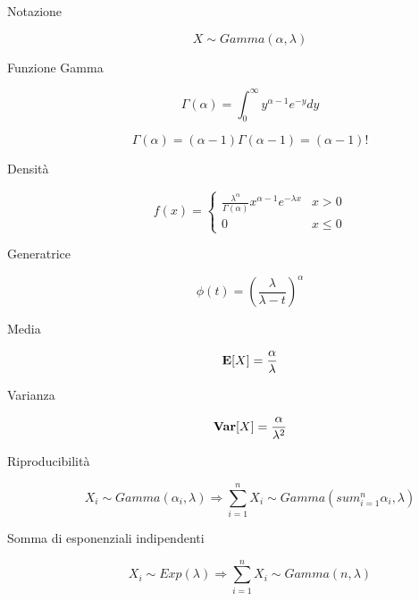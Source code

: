 \begin{description}
	
	\item [Notazione]
		\begin{equation}
		X \sim Gamma(\alpha,\lambda)
		\end{equation}
	
	\item [Funzione Gamma]
		\begin{equation}
		\Gamma(\alpha) = \int_{0}^{\infty} y^{\alpha-1}e^{-y} dy
		\end{equation}
		
		\begin{equation}
		\Gamma(\alpha) = (\alpha-1)\Gamma(\alpha-1) = (\alpha-1)!
		\end{equation}
	
	\item [Densità]
		\begin{equation}
		f(x) = \left\{\begin{matrix}
		\frac{\lambda^{\alpha}}{\Gamma(\alpha)} x^{\alpha-1}e^{-\lambda x} & x > 0\\
		0 & x \leq 0
		\end{matrix}\right.
		\end{equation}
		
	\item [Generatrice]
		\begin{equation}
		\phi(t) = (\frac{\lambda}{\lambda-t})^{\alpha}
		\end{equation}
		
	\item [Media]
		\begin{equation}
		\mathbf{E}[X] = \frac{\alpha}{\lambda}
		\end{equation}

	\item [Varianza]
		\begin{equation}
		\mathbf{Var}[X] = \frac{\alpha}{\lambda^{2}}
		\end{equation}
		
	\item [Riproducibilità]
		\begin{equation}
		X_{i} \sim Gamma(\alpha_{i},\lambda) \Rightarrow \sum_{i=1}^{n}X_{i} \sim Gamma(sum_{i=1}^{n}\alpha_{i},\lambda)
		\end{equation}
		
	\item [Somma di esponenziali indipendenti]
		\begin{equation}
		X_{i} \sim Exp(\lambda) \Rightarrow \sum_{i=1}^{n}X_{i} \sim Gamma(n,\lambda)
		\end{equation}

\end{description}



